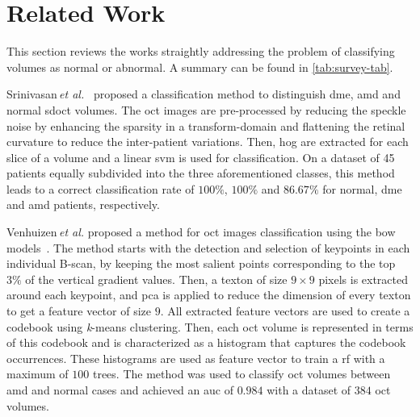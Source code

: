 
\section{Related Work}\label{sec:rw}
This section reviews the works straightly addressing the problem of classifying \oct volumes as normal or abnormal. A summary can be found in \ref{tab:survey-tab}.

Srinivasan\,\textit{et al.}~\cite{Srinivasan2014} proposed a classification method to distinguish \ac{dme}, \ac{amd} and normal \ac{sdoct} volumes.
The \ac{oct} images are pre-processed by reducing the speckle noise by enhancing the sparsity in a transform-domain and flattening the retinal curvature to reduce the inter-patient variations.
Then, \ac{hog} are extracted for each slice of a volume and a linear \ac{svm} is used for classification.
On a dataset of 45 patients equally subdivided into the three aforementioned classes, this method leads to a correct classification rate of $100 \%$, $100 \%$ and $86.67 \%$ for normal, \ac{dme} and \ac{amd} patients, respectively.

Venhuizen\,\textit{et al.} proposed a method for \ac{oct} images classification using the \ac{bow} models~\cite{Venhuizen2015}.
The method starts with the detection and selection of keypoints in each individual B-scan, by keeping the most salient points corresponding to the top $3 \%$ of the vertical gradient values. Then, a texton of size $9 \times 9$ pixels is extracted around each keypoint, and \ac{pca} is applied to reduce the dimension of every texton to get a feature vector of size $9$.
All extracted feature vectors are used to create a codebook using \textit{k}-means clustering.
Then, each \ac{oct} volume is represented in terms of this codebook and is characterized as a histogram that captures the codebook occurrences.
These histograms are used as feature vector to train a \ac{rf} with a maximum of $100$ trees.
The method was used to classify \ac{oct} volumes between \ac{amd} and normal cases and achieved an \ac{auc} of $0.984$ with a dataset of $384$ \ac{oct} volumes.

